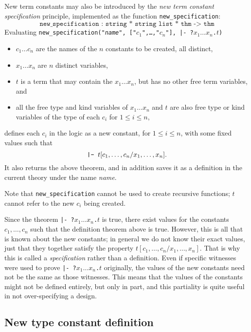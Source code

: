 New term constants may also be introduced by the {\it new term constant specification\/}
principle, implemented as the \ML{} function \texttt{new\_specification}:
\[\texttt{new\_specification~:~string * string list * thm~->~thm}\]
%
Evaluating
\texttt{new\_specification("\mbox{\it name}",~["$c_1$",\ldots,"$c_n$"],~|-~?$x_1 \ldots x_n${.}$t$)}
\begin{itemize}
\item $c_1 \ldots c_n$ are the names of the $n$ constants to be created, all distinct,
\item $x_1 \ldots x_n$ are $n$ distinct variables,
\item $t$ is a term that may contain the $x_1 \ldots x_n$, but has no other
free term variables, and
\item all the free type and kind variables of $x_1 \ldots x_n$ and $t$ are also
free type or kind variables of the type of each $c_i$ for $1 \le i \le n$,
\end{itemize}
defines each $c_i$ in the logic as a new constant, for $1 \le i \le n$,
with some fixed values such that
\[\mbox{\texttt{|- }}t [ c_1,\ldots,c_n / x_1,\ldots,x_n ].\]
It also returns the above theorem, and in addition saves it
as a definition in the current theory under the name {\it name}.

Note that \texttt{new\_specification} cannot be used to create recursive
functions; $t$ cannot refer to the new $c_i$ being created.

Since the theorem \texttt{|-~?$x_1 \ldots x_n${.}$t$} is true, there exist
values for the constants $c_1,\ldots,c_n$ such that the definition theorem 
above is true.  However, this is all that is known about the new constants;
in general we do not know their exact values, just that they together satisfy
the property $t [ c_1,\ldots,c_n / x_1,\ldots,x_n ]$.  That is why this
is called a {\it specification\/} rather than a definition. Even if specific
witnesses were used to prove \texttt{|-~?$x_1 \ldots x_n${.}$t$} originally,
the values of the new constants need not be the same as those witnesses.
This means that the values of the constants might not be defined entirely,
but only in part, and this partiality is quite useful in not over-specifying
a design.

\subsection{New type constant definition}

